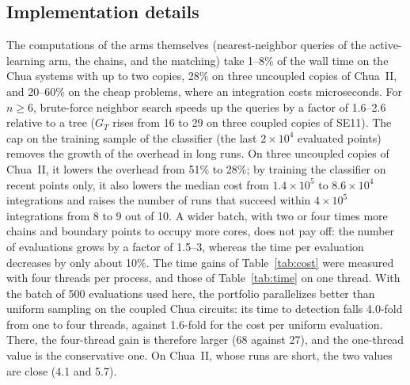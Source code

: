 \subsection{Implementation details}\label{sec:impl}

The computations of the arms themselves (nearest-neighbor queries of the active-learning arm, the chains, and the matching) take 1--8\% of the wall time on the Chua systems with up to two copies, 28\% on three uncoupled copies of Chua~II, and 20--60\% on the cheap problems, where an integration costs microseconds. For $n\ge6$, brute-force neighbor search speeds up the queries by a factor of 1.6--2.6 relative to a tree ($G_T$ rises from 16 to 29 on three coupled copies of SE11). The cap on the training sample of the classifier (the last $2\times10^4$ evaluated points) removes the growth of the overhead in long runs. On three uncoupled copies of Chua~II, it lowers the overhead from 51\% to 28\%; by training the classifier on recent points only, it also lowers the median cost from $1.4\times10^5$ to $8.6\times10^4$ integrations and raises the number of runs that succeed within $4\times10^5$ integrations from 8 to 9 out of 10. A wider batch, with two or four times more chains and boundary points to occupy more cores, does not pay off: the number of evaluations grows by a factor of 1.5--3, whereas the time per evaluation decreases by only about 10\%. The time gains of Table~\ref{tab:cost} were measured with four threads per process, and those of Table~\ref{tab:time} on one thread. With the batch of 500 evaluations used here, the portfolio parallelizes better than uniform sampling on the coupled Chua circuits: its time to detection falls 4.0-fold from one to four threads, against 1.6-fold for the cost per uniform evaluation. There, the four-thread gain is therefore larger (68 against 27), and the one-thread value is the conservative one. On Chua~II, whose runs are short, the two values are close (4.1 and 5.7).

